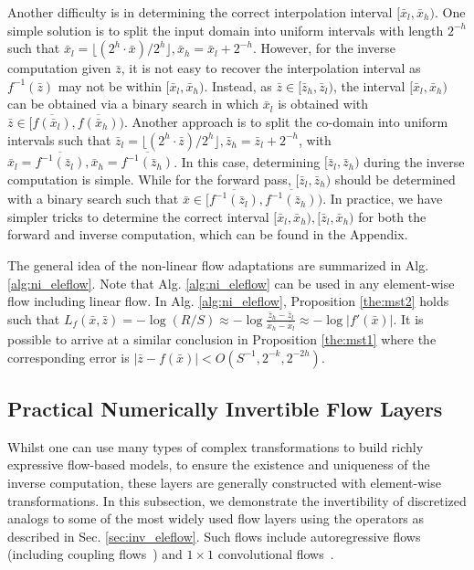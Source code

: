 \documentclass{article}
\newcommand{\quant}[1]{\bar{#1}}
\begin{document}
Another difficulty is in determining the correct interpolation interval $[\quant{x}_l, \quant{x}_h)$. One simple solution is to split the input domain into uniform intervals with length $2^{-h}$ such that $\quant{x}_l = \lfloor (2^h \cdot \quant{x}) / 2^h \rfloor, \quant{x}_h = \quant{x}_l + 2^{-h}$. However, for the inverse computation given $\quant{z}$, it is not easy to recover the interpolation interval as $f^{-1} (\quant{z})$ may not be within $[\quant{x}_l, \quant{x}_h)$. Instead, as $\quant{z} \in [\quant{z}_h, \quant{z}_l)$, the interval $[\quant{x}_l, \quant{x}_h)$ can be obtained via a binary search in which $\quant{x}_l$ is obtained with $\quant{z} \in [\overline{f(\quant{x}_l)}, \overline{f(\quant{x}_h)})$. Another approach is to split the co-domain into uniform intervals such that $\quant{z}_l = \lfloor (2^h \cdot \quant{z}) / 2^h \rfloor, \quant{z}_h = \quant{z}_l + 2^{-h}$, with $\quant{x}_l = \overline{f^{-1} (\quant{z}_l)}, \quant{x}_h = \overline{f^{-1} (\quant{z}_h)}$. In this case, determining $[\quant{z}_l, \quant{z}_h)$ during the inverse computation is simple. While for the forward pass, $[\quant{z}_l, \quant{z}_h)$ should be determined with a binary search such that $\quant{x} \in [\overline{f^{-1}(\quant{z}_l)}, \overline{f^{-1}(\quant{z}_h)})$. In practice, we have simpler tricks to determine the correct interval $[\bar{x}_l, \bar{x}_h), [\bar{z}_l, \bar{x}_h)$ for both the forward and inverse computation, which can be found in the Appendix.

The general idea of the non-linear flow adaptations are summarized in Alg. \ref{alg:ni_eleflow}. Note that Alg. \ref{alg:ni_eleflow} can be used in any element-wise flow including linear flow. In Alg. \ref{alg:ni_eleflow}, Proposition \ref{the:mst2} holds such that 
$L_f(\bar{x}, \bar{z}) = -\log (R/S) \approx -\log \frac{\quant{z}_h - \quant{z}_l}{\quant{x}_h - \quant{x}_l} \approx -\log |f'(\bar{x})|$. 
It is possible to arrive at a similar conclusion in Proposition \ref{the:mst1} where the corresponding error is $|\bar{z} - f(\bar{x})| < O(S^{-1}, 2^{-k}, 2^{-2h})$. 

\subsection{Practical Numerically Invertible Flow Layers}
\label{sec:inv_general}

Whilst one can use many types of complex transformations to build richly expressive flow-based models, to ensure the existence and uniqueness of the inverse computation, these layers are generally constructed with element-wise transformations. In this subsection, we demonstrate the invertibility of discretized analogs to some of the most widely used flow layers using the operators as described in Sec. \ref{sec:inv_eleflow}. Such flows include autoregressive flows~\cite{huang2018neural} (including coupling flows~\cite{dinh2014nice,dinh2016density,ho2019flow++}) and $1 \times 1$ convolutional flows~\cite{kingma2018glow}. 
\end{document}
